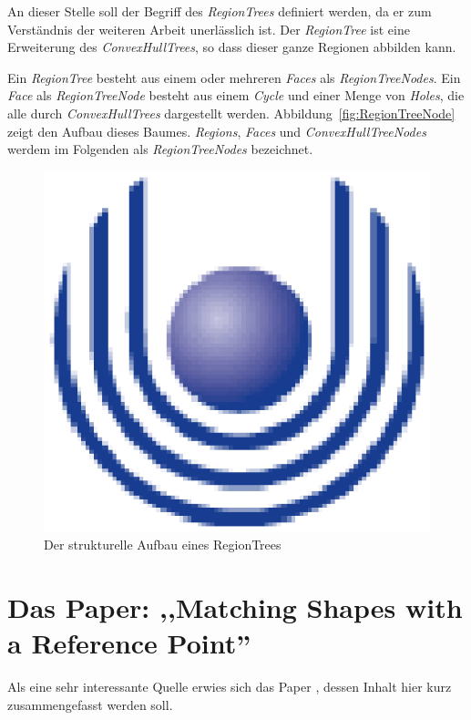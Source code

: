 An dieser Stelle soll der Begriff des \textit{RegionTrees} definiert werden, da er zum Verständnis der weiteren Arbeit unerlässlich ist. Der \textit{RegionTree} ist eine Erweiterung des \textit{ConvexHullTrees}, so dass dieser ganze Regionen abbilden kann. 

Ein \textit{RegionTree} besteht aus einem oder mehreren \textit{Faces} als \textit{RegionTreeNodes}. Ein \textit{Face} als \textit{RegionTreeNode} besteht aus einem \textit{Cycle} und einer Menge von \textit{Holes}, die alle durch \textit{ConvexHullTrees} dargestellt werden. Abbildung~\vref{fig:RegionTreeNode} zeigt den Aufbau dieses Baumes. \textit{Regions}, \textit{Faces} und \textit{ConvexHullTreeNodes} werdem im Folgenden als \textit{RegionTreeNodes} bezeichnet.

\begin{figure}
	\centering
	\includegraphics{feu_logo2.eps}
	\caption{Der strukturelle Aufbau eines RegionTrees}
	\label{fig:RegionTreeNode}
\end{figure}

\section[Matching Shapes with a Reference Point]{Das Paper: ,,Matching Shapes with a Reference Point'' }\label{AARR}

Als eine sehr interessante Quelle erwies sich das Paper \cite{AAR}, dessen Inhalt hier kurz zusammengefasst werden soll.

